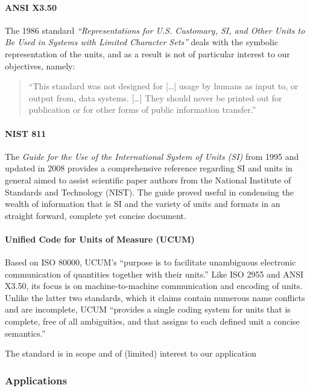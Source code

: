 \paragraph{ANSI X3.50}\label{ansi-x3.50}

The 1986 standard \emph{``Representations for U.S. Customary, SI, and
Other Units to Be Used in Systems with Limited Character Sets''} deals
with the symbolic representation of the units, and as a result is not of
particular interest to our objectives, namely:

\begin{quote}
``This standard was not designed for {[}\ldots{}{]} usage by humans as
input to, or output from, data systems. {[}\ldots{}{]} They should never
be printed out for publication or for other forms of public information
transfer.''
\end{quote}

\paragraph{NIST 811}\label{nist-811}

The \emph{Guide for the Use of the International System of Units (SI)}
from 1995 and updated in 2008 provides a comprehensive reference
regarding SI and units in general aimed to assist scientific paper
authors from the National Institute of Standards and Technology (NIST).
The guide proved useful in condensing the wealth of information that is
SI and the variety of units and formats in an straight forward, complete
yet concise document.

\paragraph{Unified Code for Units of Measure
(UCUM)}\label{unified-code-for-units-of-measure-ucum}

Based on ISO 80000, UCUM's ``purpose is to facilitate unambiguous
electronic communication of quantities together with their units.'' Like
ISO 2955 and ANSI X3.50, its focus is on machine-to-machine
communication and encoding of units. Unlike the latter two standards,
which it claims contain numerous name conflicts and are incomplete, UCUM
``provides a single coding system for units that is complete, free of
all ambiguities, and that assigns to each defined unit a concise
semantics.''

The standard is in scope and of (limited) interest to our application

\subsubsection{Applications}\label{applications}

